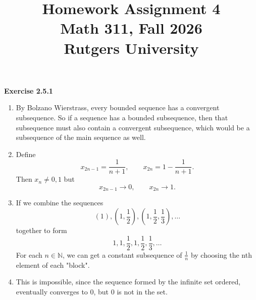 \documentclass[12pt]{article}
\title{Homework Assignment 4 \\ \large Math 311, Fall 2026 \\ Rutgers University}
\author{}
\date{}
\begin{document}
\maketitle

\textbf{Exercise 2.5.1}
\begin{enumerate}[label=(\alph*)]
    \item By Bolzano Wierstrass, every bounded sequence has a convergent subsequence.
          So if a sequence has a bounded subsequence, then that subsequence must also contain a convergent subsequence,
          which would be a subsequence of the main sequence as well.

    \item Define
          \[
              x_{2n-1} = \frac{1}{n+1}, \qquad x_{2n} = 1 - \frac{1}{n+1}.
          \]
          Then \( x_n \neq 0,1 \) but
          \[
              x_{2n-1} \to 0, \qquad x_{2n} \to 1.
          \]

    \item If we combine the sequences
          \[
              (1), (1, \frac{1}{2}), (1,\frac{1}{2},\frac{1}{3}), \dots
          \]
          together to form
          \[
              1, 1, \frac{1}{2}, 1, \frac{1}{2}, \frac{1}{3}, \dots
          \]
          For each $n \in \mathbb{N}$, we can get a constant subsequence of \( \frac{1}{n} \) by
          choosing the nth element of each "block".

    \item This is impossible, since the sequence formed by the infinite set ordered, eventually converges to 0, but 0 is not in the set.


\end{enumerate}
\end{document}
